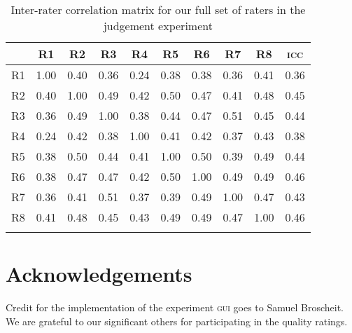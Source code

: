\documentclass[output=paper]{LSP/langsci}
\begin{document}
\begin{table}[h]
  \begin{tabular*}{\textwidth}{@{\extracolsep{\fill}}lcccccccc@{\qquad}c}
   \lsptoprule
           & R1 & R2 & R3 & R4 & R5 & R6 & R7 & R8 & \textsc{icc}\\\midrule
\addlinespace
  R1 & 1.00 & 0.40 & 0.36 & 0.24 & 0.38 & 0.38 & 0.36 & 0.41 & 0.36\\
  R2 & 0.40 & 1.00 & 0.49 & 0.42 & 0.50 & 0.47 & 0.41 & 0.48 & 0.45\\
  R3 & 0.36 & 0.49 & 1.00 & 0.38 & 0.44 & 0.47 & 0.51 & 0.45 & 0.44\\
  R4 & 0.24 & 0.42 & 0.38 & 1.00 & 0.41 & 0.42 & 0.37 & 0.43 & 0.38\\
  R5 & 0.38 & 0.50 & 0.44 & 0.41 & 1.00 & 0.50 & 0.39 & 0.49 & 0.44\\
  R6 & 0.38 & 0.47 & 0.47 & 0.42 & 0.50 & 1.00 & 0.49 & 0.49 & 0.46\\
  R7 & 0.36 & 0.41 & 0.51 & 0.37 & 0.39 & 0.49 & 1.00 & 0.47 & 0.43\\
  R8 & 0.41 & 0.48 & 0.45 & 0.43 & 0.49 & 0.49 & 0.47 & 1.00 & 0.46\\
   \lspbottomrule
  \end{tabular*}
  \caption{Inter-rater correlation matrix for our full set of raters in the judgement experiment}
  \label{tab:irc-matrix}
\end{table}


\renewcommand{\thesection}{\arabic{section}} 
\renewcommand{\thechapter}{\arabic{chapter}} 

\section*{Acknowledgements}

Credit for the implementation of the experiment \textsc{gui} goes to Samuel Broscheit. We are grateful to our significant others for participating in the quality ratings.

\sloppy
\printbibliography[heading=subbibliography,notkeyword=this] 
\end{document}
